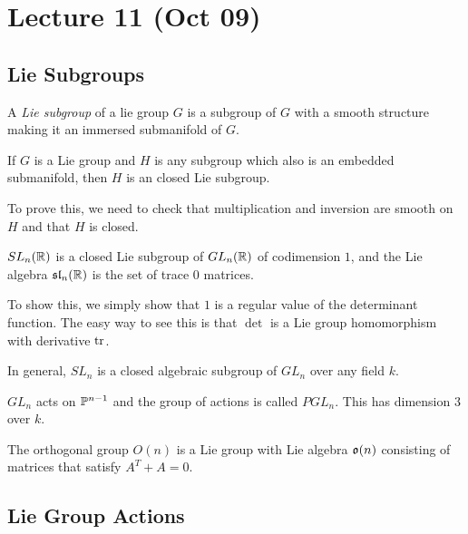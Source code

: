 \documentclass[twoside, 10pt]{article}
\begin{document}
    \section{Lecture 11 (Oct 09)}%
    \label{sec:lecture_11_oct_09_}
    
    \subsection{Lie Subgroups}%
    \label{sub:lie_subgroups}
    
    
    \begin{defn}
        A \textit{Lie subgroup} of a lie group $G$ is a subgroup of $G$ with a smooth structure making it an immersed submanifold of $G$.
    \end{defn}

    \begin{prop}
        If $G$ is a Lie group and $H$ is any subgroup which also is an embedded submanifold, then $H$ is an closed Lie subgroup.
    \end{prop}

    To prove this, we need to check that multiplication and inversion are smooth on $H$ and that $H$ is closed.

    \begin{exm}
        $SL_n(\R)$ is a closed Lie subgroup of $GL_n(\R)$ of codimension $1$, and the Lie algebra $\mf{sl}_n(\R)$ is the set of trace $0$ matrices.
    \end{exm}

    To show this, we simply show that $1$ is a regular value of the determinant function. The easy way to see this is that $\det$ is a Lie group homomorphism with derivative $\tr$.

    \begin{exm}
        In general, $SL_n$ is a closed algebraic subgroup of $GL_n$ over any field $k$.
    \end{exm}

    \begin{exm}
        $GL_n$ acts on $\P^{n-1}$ and the group of actions is called $PGL_n$. This has dimension $3$ over $k$.
    \end{exm}

    \begin{exm}
        The orthogonal group $O(n)$ is a Lie group with Lie algebra $\mf{o}(n)$ consisting of matrices that satisfy $A^T+A = 0$.
    \end{exm}

    \subsection{Lie Group Actions}%
    \label{sub:lie_group_actions}
    
\end{document}
